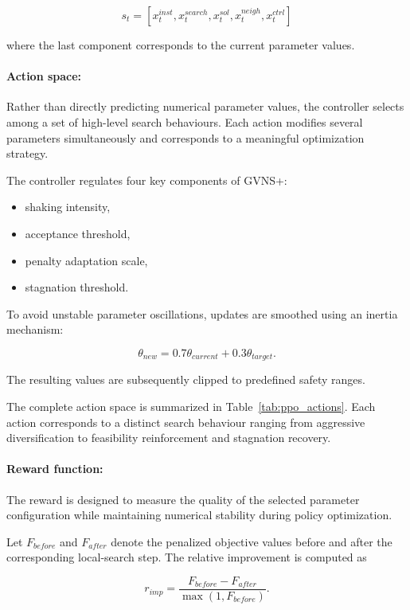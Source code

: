 \[
s_t=
[x_t^{inst},
x_t^{search},
x_t^{sol},
x_t^{neigh},
x_t^{ctrl}]
\]

where the last component corresponds to the current parameter values.

\paragraph{Action space: }
Rather than directly predicting numerical parameter values, the controller selects among a set of high-level search behaviours. Each action modifies several parameters simultaneously and corresponds to a meaningful optimization strategy.

The controller regulates four key components of GVNS+:

\begin{itemize}
\item shaking intensity,
\item acceptance threshold,
\item penalty adaptation scale,
\item stagnation threshold.
\end{itemize}

To avoid unstable parameter oscillations, updates are smoothed using an inertia mechanism:

\[
\theta_{new}
=
0.7\theta_{current}
+
0.3\theta_{target}.
\]

The resulting values are subsequently clipped to predefined safety ranges.


The complete action space is summarized in Table~\ref{tab:ppo_actions}. Each action corresponds to a distinct search behaviour ranging from aggressive diversification to feasibility reinforcement and stagnation recovery.


\paragraph{Reward function: }

The reward is designed to measure the quality of the selected parameter configuration while maintaining numerical stability during policy optimization.

Let $F_{before}$ and $F_{after}$ denote the penalized objective values before and after the corresponding local-search step. The relative improvement is computed as

\[
r_{imp}
=
\frac{F_{before}-F_{after}}
{\max(1,F_{before})}.
\]

